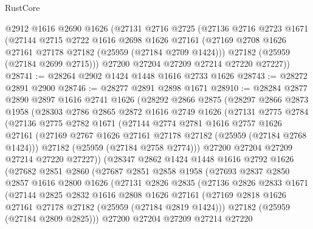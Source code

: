 \begin{lexlean}{RustCore}
\begin{coremodule}
    @2912
    @1616
    @2690
    @1626
    (@27131
      @2716
      @2725
      (@27136
        @2716
        @2723
        @1671
        (@27144
          @2715
          @2722
          @1616
          @2698
          @1626
          @27161
          (@27169 @2708 @1626 @27161 @27178 @27182 (@25959 (@27184 @2709 @1424)))
          @27182
          (@25959 (@27184 @2699 @2715)))
        @27200
        @27204
        @27209
        @27214
        @27220
        @27227))
@28741 := @28264 @2902 @1424 @1448 @1616 @2733 @1626
@28743 := @28272 @2891 @2900
@28746 := @28277 @2891 @2898 @1671
@28910 := @28284
    @2877
    @2890
    @2897
    @1616
    @2741
    @1626
    (@28292
      @2866
      @2875
      (@28297
        @2866
        @2873
        @1958
        (@28303
          @2786
          @2865
          @2872
          @1616
          @2749
          @1626
          (@27131
            @2775
            @2784
            (@27136
              @2775
              @2782
              @1671
              (@27144
                @2774
                @2781
                @1616
                @2757
                @1626
                @27161
                (@27169 @2767 @1626 @27161 @27178 @27182 (@25959 (@27184 @2768 @1424)))
                @27182
                (@25959 (@27184 @2758 @2774)))
              @27200
              @27204
              @27209
              @27214
              @27220
              @27227))
          (@28347
            @2862
            @1424
            @1448
            @1616
            @2792
            @1626
            (@27682
              @2851
              @2860
              (@27687
                @2851
                @2858
                @1958
                (@27693
                  @2837
                  @2850
                  @2857
                  @1616
                  @2800
                  @1626
                  (@27131
                    @2826
                    @2835
                    (@27136
                      @2826
                      @2833
                      @1671
                      (@27144
                        @2825
                        @2832
                        @1616
                        @2808
                        @1626
                        @27161
                        (@27169 @2818 @1626 @27161 @27178 @27182 (@25959 (@27184 @2819 @1424)))
                        @27182
                        (@25959 (@27184 @2809 @2825)))
                      @27200
                      @27204
                      @27209
                      @27214
                      @27220

\end{coremodule}
\end{lexlean}
